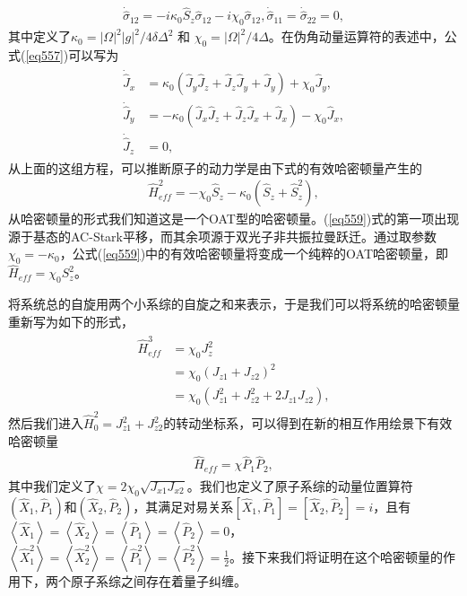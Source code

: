 \begin{align}
	{\dot{ \hat{ \sigma}} _{12}} =  - i{\kappa _0}{\hat S_z}{{ \hat{ \sigma}} _{12}}
	- i{\chi _0}{{ \hat{ \sigma}} _{12}},{\dot { \hat{ \sigma}} _{11}} = {\dot { \hat{ \sigma}} _{22}} = 0,\label{eq557}
\end{align}
其中定义了$\kappa_0=|\Omega|^2{|g|^2}/4{\delta\Delta^2}$ 和 $\chi_0 ={|\Omega|^2}/{4\Delta}$。在伪角动量运算符的表述中，公式(\ref{eq557})可以写为
\begin{align}\label{eq558}
	\begin{split}
		{{\dot {\hat J}}_x} &=  {\kappa _0}\left( {{{\hat J}_y}{{\hat J}_z} 
			+ {{\hat J}_z}{{\hat J}_y}} +{{\hat J}_y}\right) 
		+ {\chi _0}{{\hat J}_y},\\
		{{\dot {\hat J}}_y} &=- {\kappa _0}\left( {{{\hat J}_x}{{\hat J}_z} 
			+ {{\hat J}_z}{{\hat J}_x}} +{{\hat J}_x}\right) 
		- {\chi _0}{{\hat J}_x},\\
		{{\dot {\hat J}}_z} &= 0,
	\end{split}
\end{align}
从上面的这组方程，可以推断原子的动力学是由下式的有效哈密顿量产生的
\begin{align}
	\hat H_{eff}^2=-\chi_0\hat S_z-\kappa_0(\hat S_z+\hat S_z^2),
	\label{eq559}
\end{align}
从哈密顿量的形式我们知道这是一个OAT型的哈密顿量\cite{PRA1993Kitagawa}。(\ref{eq559})式的第一项出现源于基态的AC-Stark平移，而其余项源于双光子非共振拉曼跃迁。通过取参数$\chi_0=-\kappa_0$，公式(\ref{eq559})中的有效哈密顿量将变成一个纯粹的OAT哈密顿量，即$\hat H_{eff}=\chi_0 S_z^2$。

将系统总的自旋用两个小系综的自旋之和来表示，于是我们可以将系统的哈密顿量重新写为如下的形式，
\begin{align}\label{eq5510}
	\begin{split}
		\hat H_{eff}^3& = {\chi _0}J_z^2\\
		&= {\chi _0}{({J_{z1}} + {J_{z2}})^2}\\
		&= {\chi _0}(J_{z1}^2 + J_{z2}^2 + 2{J_{z1}}{J_{z2}}),
	\end{split}
\end{align}
然后我们进入$\hat H_0^2 = J_{z1}^2 + J_{z2}^2$的转动坐标系，可以得到在新的相互作用绘景下有效哈密顿量
\begin{align}\label{eq5511}
	\begin{split}
		\hat{H}_{eff}=\chi\hat{P}_1\hat{P}_2,
	\end{split}
\end{align}
其中我们定义了$\chi=2\chi_0 \sqrt{J_{x1}J_{x2}}$。我们也定义了原子系综的动量位置算符$\left( {{{\hat X}_1},{{\hat P}_1}} \right)$和$\left( {{{\hat X}_2},{{\hat P}_2}} \right)$，其满足对易关系$\left[ {{{\hat X}_1},{{\hat P}_1}} \right] = \left[ {{{\hat X}_2},{{\hat P}_2}} \right] = i$，且有$\left\langle {{{\hat X}_1}} \right\rangle  = \left\langle {{{\hat X}_2}} \right\rangle  = \left\langle {{{\hat P}_1}} \right\rangle  = \left\langle {{{\hat P}_2}} \right\rangle  = 0$，$\left\langle {\hat X_1^2} \right\rangle  = \left\langle {\hat X_2^2} \right\rangle  = \left\langle {\hat P_1^2} \right\rangle  = \left\langle {\hat P_2^2} \right\rangle  = \frac{1}{2}$。接下来我们将证明在这个哈密顿量的作用下，两个原子系综之间存在着量子纠缠。


